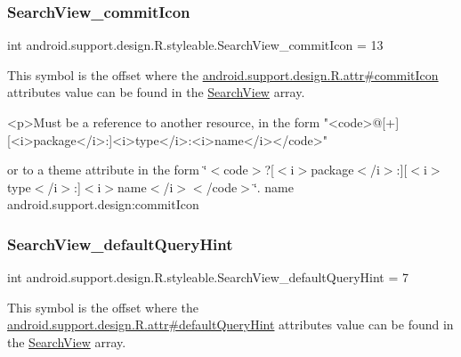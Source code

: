 \subsubsection{\texorpdfstring{Search\+View\+\_\+commit\+Icon}{SearchView\_commitIcon}}
{\footnotesize\ttfamily int android.\+support.\+design.\+R.\+styleable.\+Search\+View\+\_\+commit\+Icon = 13\hspace{0.3cm}{\ttfamily [static]}}

This symbol is the offset where the \hyperlink{classandroid_1_1support_1_1design_1_1R_1_1attr_ae2e4fb1b24069509fc70fec10a60810f}{android.\+support.\+design.\+R.\+attr\#commit\+Icon} attribute\textquotesingle{}s value can be found in the \hyperlink{classandroid_1_1support_1_1design_1_1R_1_1styleable_a8f7e72dc1bf854e14c1be7dbc1cb7392}{Search\+View} array.

\begin{DoxyVerb}      <p>Must be a reference to another resource, in the form "<code>@[+][<i>package</i>:]<i>type</i>:<i>name</i></code>"
\end{DoxyVerb}
 or to a theme attribute in the form \char`\"{}$<$code$>$?\mbox{[}$<$i$>$package$<$/i$>$\+:\mbox{]}\mbox{[}$<$i$>$type$<$/i$>$\+:\mbox{]}$<$i$>$name$<$/i$>$$<$/code$>$\char`\"{}.  name android.\+support.\+design\+:commit\+Icon \mbox{\label{classandroid_1_1support_1_1design_1_1R_1_1styleable_a169926ffb29c292c78de7f9770a418e6}} 
\subsubsection{\texorpdfstring{Search\+View\+\_\+default\+Query\+Hint}{SearchView\_defaultQueryHint}}
{\footnotesize\ttfamily int android.\+support.\+design.\+R.\+styleable.\+Search\+View\+\_\+default\+Query\+Hint = 7\hspace{0.3cm}{\ttfamily [static]}}

This symbol is the offset where the \hyperlink{classandroid_1_1support_1_1design_1_1R_1_1attr_a5abb1108b710be231b2aeea1142b9ca2}{android.\+support.\+design.\+R.\+attr\#default\+Query\+Hint} attribute\textquotesingle{}s value can be found in the \hyperlink{classandroid_1_1support_1_1design_1_1R_1_1styleable_a8f7e72dc1bf854e14c1be7dbc1cb7392}{Search\+View} array.

